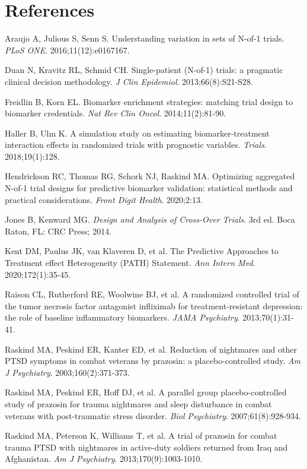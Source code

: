 \documentclass[11pt]{article}
\begin{document}
\section{References}

\sloppy

Araujo A, Julious S, Senn S. Understanding variation in sets of
N-of-1 trials. \textit{PLoS ONE}. 2016;11(12):e0167167.

Duan N, Kravitz RL, Schmid CH. Single-patient (N-of-1) trials: a
pragmatic clinical decision methodology. \textit{J Clin Epidemiol}.
2013;66(8):S21-S28.

Freidlin B, Korn EL. Biomarker enrichment strategies: matching
trial design to biomarker credentials. \textit{Nat Rev Clin Oncol}.
2014;11(2):81-90.

Haller B, Ulm K. A simulation study on estimating
biomarker-treatment interaction effects in randomized trials
with prognostic variables. \textit{Trials}. 2018;19(1):128.

Hendrickson RC, Thomas RG, Schork NJ, Raskind MA. Optimizing
aggregated N-of-1 trial designs for predictive biomarker
validation: statistical methods and practical considerations.
\textit{Front Digit Health}. 2020;2:13.

Jones B, Kenward MG. \textit{Design and Analysis of Cross-Over Trials}.
3rd ed. Boca Raton, FL: CRC Press; 2014.

Kent DM, Paulus JK, van Klaveren D, et al. The Predictive
Approaches to Treatment effect Heterogeneity (PATH) Statement.
\textit{Ann Intern Med}. 2020;172(1):35-45.

Raison CL, Rutherford RE, Woolwine BJ, et al. A randomized
controlled trial of the tumor necrosis factor antagonist
infliximab for treatment-resistant depression: the role of
baseline inflammatory biomarkers. \textit{JAMA Psychiatry}.
2013;70(1):31-41.

Raskind MA, Peskind ER, Kanter ED, et al. Reduction of
nightmares and other PTSD symptoms in combat veterans by
prazosin: a placebo-controlled study. \textit{Am J Psychiatry}.
2003;160(2):371-373.

Raskind MA, Peskind ER, Hoff DJ, et al. A parallel group
placebo-controlled study of prazosin for trauma nightmares and
sleep disturbance in combat veterans with post-traumatic stress
disorder. \textit{Biol Psychiatry}. 2007;61(8):928-934.

Raskind MA, Peterson K, Williams T, et al. A trial of prazosin
for combat trauma PTSD with nightmares in active-duty soldiers
returned from Iraq and Afghanistan. \textit{Am J Psychiatry}.
2013;170(9):1003-1010.
\end{document}
